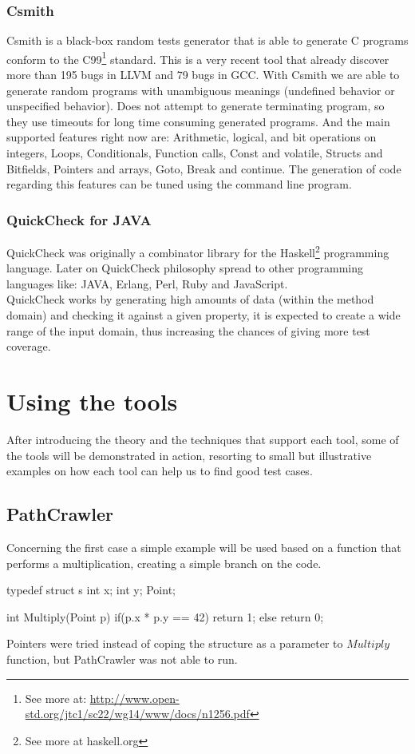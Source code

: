 \documentclass[a4paper,UKenglish]{oasics}
\begin{document}
\subsubsection{Csmith}
Csmith\cite{Yang:2011:FUB:1993316.1993532} is a black-box random tests generator that is able to generate C programs
conform to the C99\footnote{See more at: \url{http://www.open-std.org/jtc1/sc22/wg14/www/docs/n1256.pdf}} standard. This is a very recent tool that already discover
more than 195 bugs in LLVM and 79 bugs in GCC. With Csmith we are able to generate random programs with unambiguous meanings (undefined behavior or 
unspecified behavior). Does not attempt to generate terminating program, so they use timeouts for long time consuming generated programs.
And the main supported features right now are: Arithmetic, logical, and bit operations on integers, Loops, Conditionals, Function calls, Const and volatile,
Structs and Bitfields, Pointers and arrays, Goto, Break and continue. The generation of code regarding this features can be tuned using the command line program.

\subsubsection{QuickCheck for JAVA}
QuickCheck was originally a combinator library for the Haskell\footnote{See more at haskell.org} programming language\cite{Claessen:2000:QLT:357766.351266}.
Later on QuickCheck philosophy spread to other programming languages like: JAVA, Erlang, Perl, Ruby and JavaScript.\\
QuickCheck works by generating high amounts of data (within the method domain) and checking it against a given property,
it is expected to create a wide range of the input domain, thus increasing the chances of giving more test coverage.

\section{Using the tools}\label{testingtools}
After introducing the theory and the techniques that support each tool, some of the tools will be demonstrated in action, resorting to small but illustrative examples
on how each tool can help us to find good test cases.\\

\subsection{PathCrawler}
Concerning the first case  a simple example will be used based on a function that performs a multiplication, creating a simple branch on the code.
\begin{code}
typedef struct s {
    int x;
    int y;
}Point;

int Multiply(Point p) {
    if(p.x * p.y == 42) return 1;
    else return 0;
}
\end{code}
Pointers were tried instead of coping the structure as a parameter to $Multiply$ function, but PathCrawler was not able to run.
\end{document}
